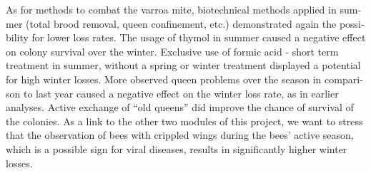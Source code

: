 \begin{otherlanguage}{english}
\newline
As for methods to combat the varroa mite, biotechnical methods applied in summer (total brood removal, queen confinement, etc.) demonstrated again the possibility for lower loss rates. The usage of thymol in summer caused a negative effect on colony survival over the winter. Exclusive use of formic acid - short term treatment in summer, without a spring or winter treatment displayed a potential for high winter losses.
\newline
More observed queen problems over the season in comparison to last year caused a negative effect on the winter loss rate, as in earlier analyses. Active exchange of \enquote{old queens} did improve the chance of survival of the colonies.
\newline
As a link to the other two modules of this project, we want to stress that the observation of bees with crippled wings during the bees' active season, which is a possible sign for viral diseases, results in significantly higher winter losses. 
\end{otherlanguage}